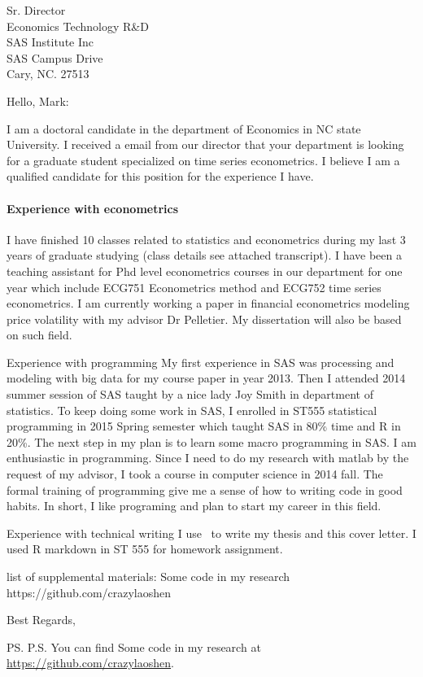 \documentclass[]{letter}
\begin{document}
\begin{letter}{Sr. Director \\ Economics Technology R\&D \\ SAS Institute Inc
		\\ SAS Campus Drive \\ Cary, NC. 27513}
	\opening{Hello, Mark:}

I am a doctoral candidate in the department of Economics in NC state University. I received a email from our director that  your department is looking for a graduate student specialized on time series econometrics. I believe I am a qualified candidate for this position for the experience I have.

\paragraph{Experience  with econometrics}
I have finished 10 classes related to statistics and econometrics during my last 3 years of graduate studying (class details see attached transcript). I have been a teaching assistant for Phd level econometrics courses in our department for one year which include ECG751 Econometrics method and ECG752 time series econometrics. I am currently working a paper in financial econometrics modeling price volatility with my advisor Dr Pelletier. My dissertation will also be  based on such field. 

Experience with programming
My first experience in SAS was processing and modeling with big data for my course paper in year 2013. Then I attended 2014 summer session of SAS taught by a nice lady Joy Smith in department of statistics. To keep doing some work in SAS, I enrolled in ST555 statistical programming in 2015 Spring semester which taught SAS in 80\% time and R in 20\%. The next step in my plan is to learn some macro programming in SAS. I am enthusiastic in programming. Since I need to do my research with matlab by the request of my advisor, I took a course in computer science in 2014 fall. The formal training of programming give me a sense of how to writing code in good habits. In short, I like programing and plan to start my career in this field.

Experience with technical writing
I use \LaTex\ to write my thesis and this cover letter. I used R markdown in ST 555 for homework assignment.



list of supplemental materials:
Some code in my research        https://github.com/crazylaoshen



\signature{Ji Shen}
\closing{Best Regards,}

\ps
P.S. You can find Some code in my research at
\url{https://github.com/crazylaoshen}.

\end{letter}
\end{document}
